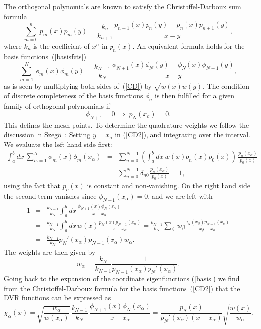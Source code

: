 \documentclass[onecolumn,letterpaper]{report}
\begin{document}
The orthogonal polynomials are known to satisfy the
Christoffel-Darboux sum formula~\cite{Gabor1939,Abramowitz1970}
\begin{equation}
\sum_{m=0}^{n} \, p_m(x) p_m(y)=\frac{k_{n}}{k_{n+1}} \,
\frac{p_{n+1}(x)p_{n}(y) 
- p_{n}(x) p_{n+1}(y)}{x-y},
\label{CD}
\end{equation}
where $k_n$ is the coefficient of $x^n$ in $p_n(x)$. An equivalent
formula holds for the basis functions~(\ref{basisfcts}) 
\begin{equation}
\sum_{m=1}^{N} \, \phi_m(x) \phi_m(y)=\frac{k_{N-1}}{k_{N}} \,
\frac{\phi_{N+1}(x)\phi_{N}(y) 
- \phi_{N}(x) \phi_{N+1}(y)}{x-y},
\label{CD2}
\end{equation}
as is seen by
multiplying both sides of~(\ref{CD}) by $\sqrt{w(x)w(y)}$. The
condition of discrete completeness of
the basis functions $\phi_n$ is then fulfilled for a given family of
orthogonal polynomials if  
\begin{equation}
\phi_{N+1}=0  \ \Longrightarrow \ p_N(x_{\alpha})=0.
\end{equation}
This defines the mesh points. To determine the
quadrature weights we follow the discussion in  
Szeg\"o~\cite{Gabor1939}: Setting $y=x_{\alpha}$ in (\ref{CD2}),
and integrating over the interval. We evaluate the left hand side
first:
\begin{eqnarray}
\int_{a}^{b}dx \, \sum_{m=1}^{N}\phi_m(x)\phi_m(x_{\alpha}) & = & 
\sum_{n=0}^{N-1} \left( \int_{a}^{b} dx \, w(x) p_n(x) p_0(x) \right)
\, \frac{p_n(x_{\alpha})}{p_0(x)} \nonumber \\
\mbox{} & =& \sum_{n=0}^{N-1} \delta_{n0} \,
\frac{p_n(x_{\alpha})}{p_0(x)} = 1,
\end{eqnarray}
using the fact that $p_o(x)$ is constant and non-vanishing.
On the right hand side the second term vanishes since
$\phi_{N+1}(x_{\alpha})=0$, and we are left with  
\begin{eqnarray}
1 &=& \frac{k_{N-1}}{k_{N}}\int_{a}^{b}dx \,
\frac{\phi_{N+1}(x)\phi_{N}(x_{\alpha})}{x-x_{\alpha}} \nonumber \\
\mbox{} &=&\frac{k_{N-1}}{k_{N}}\int_{a}^{b}dx \, w(x)
\frac{p_{N}(x) p_{N-1}(x_{\alpha})}{x-x_{\alpha}} =
\frac{k_{N-1}}{k_{N}} \sum_{\beta} \, w_{\beta} \frac{p_{N}(x_{\beta})
p_{N-1}(x_{\alpha})}{x_{\beta}-x_{\alpha}} \nonumber \\
\mbox{} &=& \frac{k_{N-1}}{k_{N}} p_N'(x_{\alpha}) p_{N-1}(x_{\alpha})
w_{\alpha}. 
\end{eqnarray}
The weights are then given by
\begin{equation}
w_{\alpha} = \frac{k_{N}}{k_{N-1}} \frac{1}{p_{N-1}(x_{\alpha})
p_{N}'(x_{\alpha})}.
\end{equation}
Going back to the expansion of the coordinate eigenfunctions
(\ref{basis}) we find from the Christoffel-Darboux formula for the
basis functions~(\ref{CD2}) that the DVR functions can be expressed as 
\begin{equation}
\chi_{\alpha}(x) = \sqrt{\frac{w_{\alpha}}{w(x_{\alpha})}} \,
\frac{k_{N-1}}{k_{N}} \,
\frac{\phi_{N+1}(x)\phi_{N}(x_{\alpha})}{x-x_{\alpha}}  
=\frac{p_{N}(x)}{p_{N}'(x_{\alpha})(x-x_{\alpha})}
\sqrt{\frac{w(x)}{w_{\alpha}}}.  
\label{chi_orthopol} 
\end{equation} 
\end{document}
